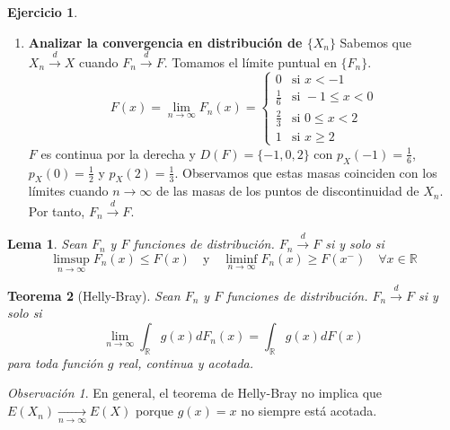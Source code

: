 \documentclass{report}
\newtheorem{theorem}{Teorema}[chapter]
\newtheorem{lemma}[theorem]{Lema}
\theoremstyle{remark}
\newtheorem*{remark}{Observación}
\theoremstyle{remark}
\theoremstyle{remark}
\theoremstyle{definition}
\theoremstyle{definition}
\theoremstyle{definition}
\theoremstyle{definition}
\newtheorem*{exercise}{Ejercicio}
\begin{document}
\begin{exercise}
\begin{enumerate}
        \item \textbf{Analizar la convergencia en distribución de $\{X_n\}$}
              Sabemos que $X_n \xrightarrow{d} X$ cuando $F_n \xrightarrow{d} F$.
              Tomamos el límite puntual en $\{F_n\}$.
              $$F(x) = \lim\limits_{n \to \infty} F_n(x) = \begin{cases}
                      0           & \text{si } x < -1        \\
                      \frac{1}{6} & \text{si } -1 \leq x < 0 \\
                      \frac{2}{3} & \text{si } 0 \leq x < 2  \\
                      1           & \text{si } x \geq 2
                  \end{cases}$$
              $F$ es continua por la derecha y $D(F) = \{-1, 0, 2\}$ con $p_X(-1) = \frac{1}{6}$, $p_X(0) = \frac{1}{2}$ y $p_X(2) = \frac{1}{3}$.
              Observamos que estas masas coinciden con los límites cuando $n \to \infty$ de las masas de los puntos de discontinuidad de $X_n$.
              Por tanto, $F_n \xrightarrow{d} F$.
    \end{enumerate}
\end{exercise}

\begin{lemma}
    Sean $F_n$ y $F$ funciones de distribución.
    $F_n \xrightarrow{d} F$ si y solo si
    $$\limsup\limits_{n \to \infty} F_n(x) \leq F(x) \quad \text{y} \quad \liminf\limits_{n \to \infty} F_n(x) \geq F(x^-) \quad \forall x \in \mathbb{R}$$
\end{lemma}

\begin{theorem}[Helly-Bray]
    Sean $F_n$ y $F$ funciones de distribución.
    $F_n \xrightarrow{d} F$ si y solo si
    $$\lim\limits_{n \to \infty} \int_\mathbb{R} g(x)dF_n(x) = \int_\mathbb{R} g(x)dF(x)$$
    para toda función $g$ real, continua y acotada.
\end{theorem}

\begin{remark}
    En general, el teorema de Helly-Bray no implica que $E(X_n) \xrightarrow[n \to \infty]{} E(X)$ porque $g(x) = x$ no siempre está acotada.
\end{remark}
\end{document}

